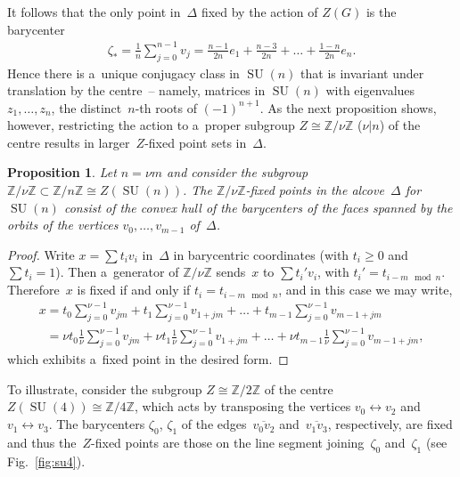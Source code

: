 \documentclass[11pt]{article}
\numberwithin{equation}{section}
\newtheorem{Proposition}[Theorem]{Proposition}
{\theoremstyle{definition}
\newtheorem{Definition}[Theorem]{Definition}
\newtheorem{Example}[Theorem]{Example}
\newtheorem{Remark}[Theorem]{Remark}
}
\DeclareMathOperator{\SU}{SU}
\begin{document}
It follows that the only point in~$\Delta$ f\/ixed by the action of $Z(G)$ is the barycenter
\begin{gather*}
\zeta_* = \frac{1}{n} \sum\limits_{j=0}^{n-1} v_j = \frac{n-1}{2n}e_1 + \frac{n-3}{2n} + \dots + \frac{1-n}{2n}e_n.
\end{gather*}
Hence there is a~unique conjugacy class in $\SU(n)$ that is invariant under translation by the centre~-- namely, matrices
in $\SU(n)$ with eigenvalues $z_1, \ldots, z_n$, the distinct~$n$-th roots of $(-1)^{n+1}$.
As the next proposition shows, however, restricting the action to a~proper subgroup $Z\cong
{\mathbb{Z}}/\nu{\mathbb{Z}}$ ($\nu|n$) of the centre results in larger~$Z$-f\/ixed point sets in~$\Delta$.

\begin{Proposition}
Let $n=\nu m$ and consider the subgroup ${\mathbb{Z}}/\nu{\mathbb{Z}} \subset {\mathbb{Z}}/n{\mathbb{Z}} \cong
Z(\SU(n))$.
The ${\mathbb{Z}}/\nu{\mathbb{Z}}$-fixed points in the alcove~$\Delta$ for $\SU(n)$ consist of the convex hull of the
barycenters of the faces spanned by the orbits of the vertices $v_0,\ldots,v_{m-1}$ of~$\Delta$.
\end{Proposition}

\begin{proof}
Write $x=\sum t_i v_i$ in~$\Delta$ in barycentric coordinates (with $t_i\geq 0$ and $\sum t_i=1$).
Then a~generator of ${\mathbb{Z}}/\nu{\mathbb{Z}}$ sends~$x$ to $\sum t_i' v_i$, with $t_i'=t_{i-m \mod n}$.
Therefore~$x$ is f\/ixed if and only if $t_i=t_{i-m \mod n}$, and in this case we may write,
\begin{gather*}
x=t_0 \sum\limits_{j=0}^{\nu-1} v_{jm} + t_1 \sum\limits_{j=0}^{\nu-1} v_{1+jm} + \dots + t_{m-1}
\sum\limits_{j=0}^{\nu-1} v_{m-1+jm}
\\
\phantom{x}{}
 =\nu t_0 \frac{1}{\nu}\sum\limits_{j=0}^{\nu-1} v_{jm} + \nu t_1 \frac{1}{\nu} \sum\limits_{j=0}^{\nu-1} v_{1+jm} +
\dots + \nu t_{m-1} \frac{1}{\nu}\sum\limits_{j=0}^{\nu-1} v_{m-1+jm},
\end{gather*}
which exhibits a~f\/ixed point in the desired form.
\end{proof}

To illustrate, consider the subgroup $Z \cong {\mathbb{Z}}/2{\mathbb{Z}}$ of the centre $Z(\SU(4)) \cong
{\mathbb{Z}}/4{\mathbb{Z}}$, which acts by transposing the vertices $v_0 \leftrightarrow v_2$ and $v_1 \leftrightarrow
v_3$.
The barycenters $\zeta_0$, $\zeta_1$ of the edges~$\overline{v_0v_2}$ and~$\overline{v_1v_3}$, respectively, are f\/ixed
and thus the~$Z$-f\/ixed points are those on the line segment joining~$\zeta_0$ and~$\zeta_1$
(see Fig.~\ref{fig:su4}).
\end{document}
